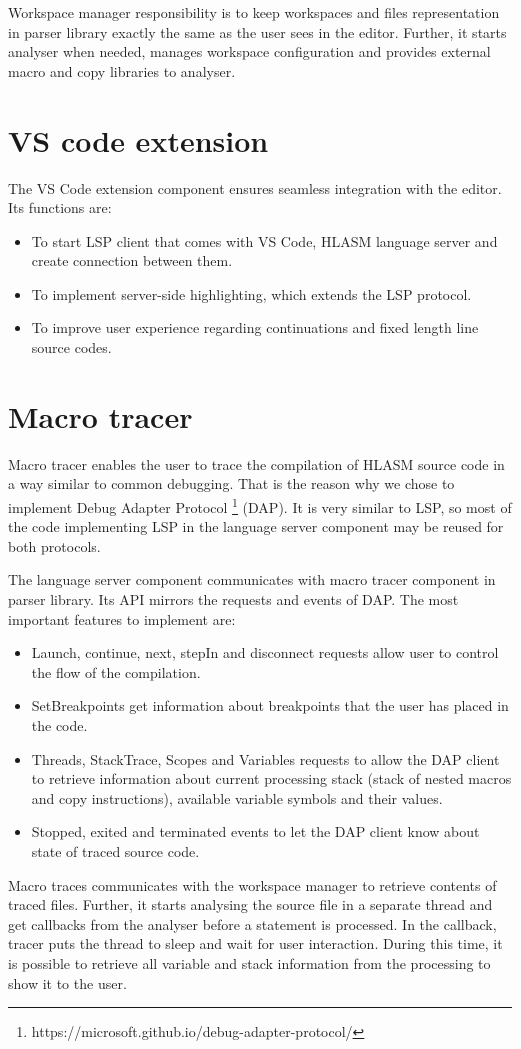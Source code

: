 Workspace manager responsibility is to keep workspaces and files representation in parser library exactly the same as the user sees in the editor. Further, it starts analyser when needed, manages workspace configuration and provides external macro and copy libraries to analyser.

\section{VS code extension}

The VS Code extension component ensures seamless integration with the editor. Its functions are:

\begin{itemize}
	\item To start LSP client that comes with VS Code, HLASM language server and create connection between them.
	\item To implement server-side highlighting, which extends the LSP protocol.
	\item To improve user experience regarding continuations and fixed length line source codes.
\end{itemize}


\section{Macro tracer}
Macro tracer enables the user to trace the compilation of HLASM source code in a way similar to common debugging. That is the reason why we chose to implement Debug Adapter Protocol \footnote{https://microsoft.github.io/debug-adapter-protocol/} (DAP). It is very similar to LSP, so most of the code implementing LSP in the language server component may be reused for both protocols.

The language server component communicates with macro tracer component in parser library. Its API mirrors the requests and events of DAP. The most important features to implement are:

\begin{itemize}
	\item Launch, continue, next, stepIn and disconnect requests allow user to control the flow of the compilation.
	\item SetBreakpoints get information about breakpoints that the user has placed in the code.
	\item Threads, StackTrace, Scopes and Variables requests to allow the DAP client to retrieve information about current processing stack (stack of nested macros and copy instructions), available variable symbols and their values.
	\item Stopped, exited and terminated events to let the DAP client know about state of traced source code.
\end{itemize}

Macro traces communicates with the workspace manager to retrieve contents of traced files. Further, it starts analysing the source file in a separate thread and get callbacks from the analyser before a statement is processed. In the callback, tracer puts the thread to sleep and wait for user interaction. During this time, it is possible to retrieve all variable and stack information from the processing to show it to the user.
